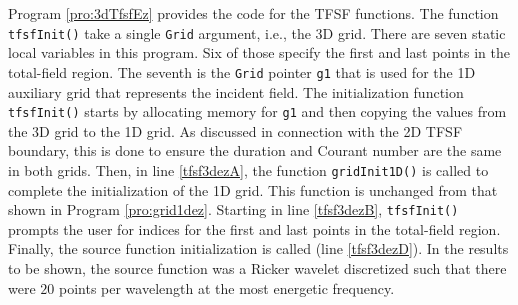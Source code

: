 Program \ref{pro:3dTfsfEz} provides the code for the TFSF functions.
The function {\tt tfsfInit()} take a single {\tt Grid} argument, i.e.,
the 3D grid.  There are seven static local variables in this program.
Six of those specify the first and last points in the total-field
region.  The seventh is the {\tt Grid} pointer {\tt g1} that is used
for the 1D auxiliary grid that represents the incident field.  The
initialization function {\tt tfsfInit()} starts by allocating memory
for {\tt g1} and then copying the values from the 3D grid to the 1D
grid.  As discussed in connection with the 2D TFSF boundary, this is
done to ensure the duration and Courant number are the same in both
grids.  Then, in line \ref{tfsf3dezA}, the function {\tt gridInit1D()}
is called to complete the initialization of the 1D grid.  This
function is unchanged from that shown in Program \ref{pro:grid1dez}.
Starting in line \ref{tfsf3dezB}, {\tt tfsfInit()} prompts the user
for indices for the first and last points in the total-field region.
Finally, the source function initialization is called (line
\ref{tfsf3dezD}).  In the results to be shown, the source function was
a Ricker wavelet discretized such that there were $20$ points per
wavelength at the most energetic frequency.

